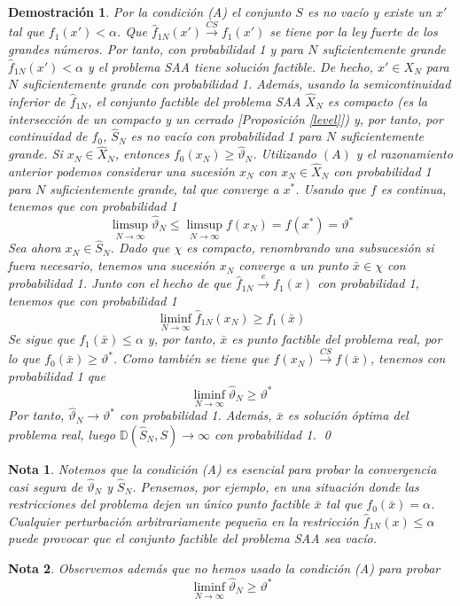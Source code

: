 \documentclass[twoside,a4paper,openright,12pt]{book}
\newtheorem{nota}{Nota}[section]
\newtheorem*{dem}{Demostración}
\providecommand{\convcs}{\xrightarrow{CS}}
\providecommand{\conve}{\xrightarrow{e}}
\newcommand{\D}{\mathbb{D}}
\newcommand{\va}{\hat{\vartheta}_N}
\begin{document}
\begin{dem}
Por la condición (A) el conjunto $S$ es no vacío y 
existe un $x'$ tal que $f_1(x')<\alpha$. Que $\hat{f}_{1N}(x') \convcs f_1(x')$ se tiene por la ley fuerte de los grandes números. Por tanto, con probabilidad 1 y para $N$ suficientemente grande $\hat{f}_{1N}(x')<\alpha$ y el problema SAA tiene solución factible. De hecho, $x'\in X_N$ para $N$ suficientemente grande con probabilidad 1. Además, usando la semicontinuidad inferior de $\hat{f}_{1N}$, el conjunto factible del problema SAA $\hat{X}_N$ es compacto (es la intersección de un compacto y un cerrado [Proposición \ref{level}]) y, por tanto, por continuidad de $f_0$, $\hat{S}_N$ es no vacío con probabilidad 1 para $N$ suficientemente grande. Si $x_N\in \hat{X}_N$, entonces $f_0(x_N)\geq \va$. Utilizando $(A)$ y el razonamiento anterior podemos considerar una sucesión $x_N$ con $x_N\in \hat{X}_N$ con probabilidad 1 para $N$ suficientemente grande, tal que converge a $x^*$. Usando que $f$ es continua, tenemos que con probabilidad 1
$$
\limsup_{N\to\infty} \va \leq \limsup_{N\to \infty} f(x_N)=  f(x^*)=  \vartheta^*$$ 
Sea ahora $x_N\in \hat{S}_N$. Dado que $\chi$ es compacto, renombrando una subsucesión si fuera necesario, tenemos una sucesión $x_N$ converge a un punto $\bar{x}\in \chi$ con probabilidad 1. Junto con el hecho de que $\hat{f}_{1N}\conve f_1(x)$ con probabilidad 1, tenemos que con probabilidad 1
$$
\liminf_{N\to\infty} \hat{f}_{1N}(x_N) \geq f_1(\bar{x})
$$
Se sigue que $f_1(\bar{x})\leq \alpha$ y, por tanto, $\bar{x}$ es punto factible del problema real, por lo que $f_0(\bar{x})\geq\vartheta^*$. Como también se tiene que $f(x_N)\convcs f(\bar{x})$, tenemos con probabilidad 1 que
$$
\liminf_{N\to\infty}\va\geq \vartheta^*
$$
Por tanto, $\va\to \vartheta^*$ con probabilidad 1. Además, $\bar{x}$ es solución óptima del problema real, luego $\D(\hat{S}_N,S)\to\infty$ con probabilidad 1. \qed
\end{dem}
\begin{nota}
Notemos que la condición (A) es esencial para probar la convergencia casi segura de $\va$ y $\hat{S}_N$. Pensemos, por ejemplo, en una situación donde las restricciones del problema dejen un único punto factible $\bar{x}$ tal que $f_0(\bar{x})=\alpha$. Cualquier perturbación arbitrariamente pequeña en la restricción $\hat{f}_{1N}(x)\leq \alpha$ puede provocar que el conjunto factible del problema SAA sea vacío.
\end{nota}
\begin{nota}
Observemos además que no hemos usado la condición (A) para probar 
$$
\liminf_{N\to\infty}\va\geq \vartheta^*
$$
\end{nota}
\end{document}
